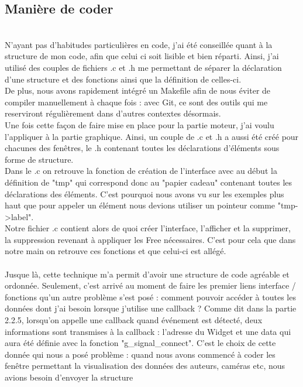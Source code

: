 \documentclass[11pt,french,a4paper]{report}
\begin{document}
        \subsection{Manière de coder}\\
N'ayant pas d'habitudes particulières en code, j'ai été conseillée quant à la structure de mon code, afin que celui
ci soit lisible et bien réparti. Ainsi, j'ai utilisé des couples de fichiers .c et .h me permettant de séparer 
la déclaration d'une structure et des fonctions ainsi que la définition de celles-ci. \\ 
De plus, nous avons rapidement intégré un Makefile afin de nous éviter de compiler manuellement à chaque fois : 
avec Git, ce sont des outils qui me reserviront régulièrement dans d'autres contextes désormais. \\
Une fois cette façon de faire mise en place pour la partie moteur, j'ai voulu l'appliquer à la partie
graphique. Ainsi, un couple de .c et .h a aussi été créé pour chacunes des fenêtres, le .h contenant 
toutes les déclarations d'éléments sous forme de structure. \\
Dans le .c on retrouve la fonction de création de l'interface avec au début la définition de "tmp" qui correspond donc 
au "papier cadeau" contenant toutes les déclarations des éléments. C'est pourquoi nous avons vu sur les exemples plus haut 
que pour appeler un élément nous devions utiliser un pointeur comme "tmp->label". \\
Notre fichier .c contient alors de quoi créer l'interface, l'afficher et la supprimer, la suppression revenant à appliquer les 
Free  nécessaires. C'est pour cela que dans notre main on retrouve ces fonctions et que celui-ci est allégé. \\
\\
Jusque là, cette technique m'a permit d'avoir une structure de code agréable et ordonnée. Seulement, c'est arrivé au moment de 
faire les premier liens interface / fonctions qu'un autre problème s'est posé : comment pouvoir accéder à toutes les données
dont j'ai besoin lorsque j'utilise une callback ? Comme dit dans la partie 2.2.5, lorsqu'on appelle une callback quand 
événement est détecté, deux informations sont transmises à la callback : l'adresse du Widget et une data qui aura été définie
avec la fonction "g\_signal\_connect". C'est le choix de cette donnée qui nous a posé problème : quand nous avons commencé
à coder les fenêtre permettant la visualisation des données des auteurs, caméras etc, nous avions besoin d'envoyer la structure
\end{document}
